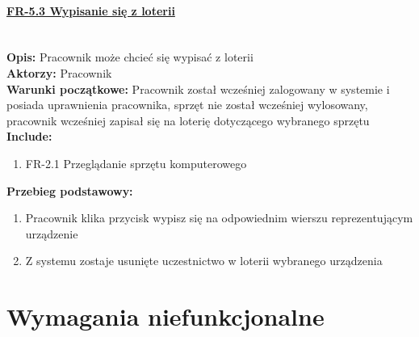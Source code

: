 \paragraph{\underline{FR-5.3 Wypisanie się z loterii}}\mbox{}\\[1mm]
	\noindent\textbf{Opis:} Pracownik może chcieć się wypisać z loterii\\
	\noindent\textbf{Aktorzy:} Pracownik\\
	\textbf{Warunki początkowe:} Pracownik został wcześniej zalogowany w systemie i posiada uprawnienia pracownika, sprzęt nie został wcześniej wylosowany, pracownik wcześniej zapisał się na loterię dotyczącego wybranego sprzętu\\
	\textbf{Include:} 
	\begin{enumerate}[noparskip]
		\item FR-2.1 Przeglądanie sprzętu komputerowego
	\end{enumerate}
    \textbf{Przebieg podstawowy:}
	\begin{enumerate}[noparskip]
		\item Pracownik klika przycisk wypisz się na odpowiednim wierszu reprezentującym urządzenie
		\item Z systemu zostaje usunięte uczestnictwo w loterii wybranego urządzenia
    \end{enumerate}

\section{Wymagania niefunkcjonalne}










